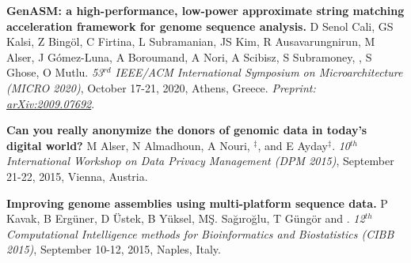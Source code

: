 \vspace{-.2cm}
    {\bf GenASM: a high-performance, low-power approximate string matching acceleration framework for genome sequence analysis.}
    D Senol Cali, GS Kalsi, Z Bingöl, C Firtina, L Subramanian, JS Kim, R Ausavarungnirun, M Alser, J Gómez-Luna, A Boroumand, A Nori, A Scibisz, S Subramoney, \calkan{}, S Ghose, O Mutlu.
    {\em 53$^{rd}$ IEEE/ACM International Symposium on Microarchitecture (MICRO 2020)}, October 17-21, 2020, Athens, Greece. \textit{Preprint: \href{https://doi.org/10.48550/arXiv.2009.07692}{arXiv:2009.07692}}.
    
\vspace{-.2cm}
{\bf Can you really anonymize the donors of genomic data in today's digital world?}
M Alser, N Almadhoun, A Nouri, \calkan{}$^\ddag$, and E Ayday$^\ddag$. 
{\em 10$^{th}$ International Workshop on Data Privacy Management (DPM 2015)}, 
 September 21-22, 2015, Vienna, Austria.

\vspace{-.2cm}

{\bf Improving genome assemblies using multi-platform sequence data.}
P Kavak, B Ergüner, D Üstek, B Yüksel, MŞ. Sağıroğlu, T Güngör and \calkan{}.
{\em 12$^{th}$ Computational Intelligence methods for Bioinformatics and Biostatistics (CIBB 2015)}, 
 September 10-12, 2015, Naples, Italy.






